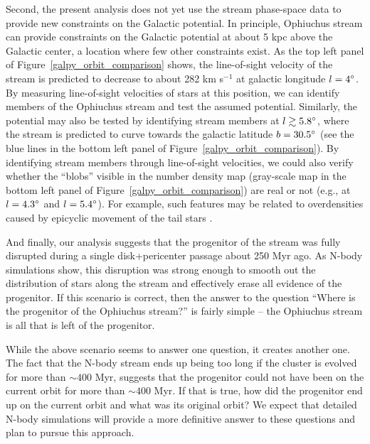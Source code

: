 \documentclass[iop]{emulateapj}
\begin{document}
Second, the present analysis does not yet use the stream phase-space data to
provide new constraints on the Galactic potential. In principle, Ophiuchus
stream can provide constraints on the Galactic potential at about 5 kpc above
the Galactic center, a location where few other constraints exist. As the top
left panel of Figure~\ref{galpy_orbit_comparison} shows, the line-of-sight
velocity of the stream is predicted to decrease to about 282 km s$^{-1}$ at
galactic longitude $l=4\mbox{$^\circ$}$. By measuring line-of-sight velocities of stars
at this position, we can identify members of the Ophiuchus stream and test the
assumed potential. Similarly, the potential may also be tested by identifying
stream members at $l\gtrsim5.8\mbox{$^\circ$}$, where the stream is predicted to curve
towards the galactic latitude $b=30.5\mbox{$^\circ$}$ (see the blue lines in the bottom
left panel of Figure~\ref{galpy_orbit_comparison}). By identifying stream
members through line-of-sight velocities, we could also verify whether the
``blobs'' visible in the number density map (gray-scale map in the bottom left
panel of Figure~\ref{galpy_orbit_comparison}) are real or not (e.g., at
$l=4.3\mbox{$^\circ$}$ and $l=5.4\mbox{$^\circ$}$). For example, such features may be related to
overdensities caused by epicyclic movement of the tail stars \citep{klh12}.

And finally, our analysis suggests that the progenitor of the stream was fully
disrupted during a single disk+pericenter passage about 250 Myr ago. As N-body
simulations show, this disruption was strong enough to smooth out the
distribution of stars along the stream and effectively erase all evidence of the
progenitor. If this scenario is correct, then the answer to the question ``Where
is the progenitor of the Ophiuchus stream?'' is fairly simple -- the Ophiuchus
stream is all that is left of the progenitor.

While the above scenario seems to answer one question, it creates another one.
The fact that the N-body stream ends up being too long if the cluster is evolved
for more than $\sim400$ Myr, suggests that the progenitor could not have been on
the current orbit for more than $\sim400$ Myr. If that is true, how did the
progenitor end up on the current orbit and what was its original orbit? We
expect that detailed N-body simulations will provide a more definitive answer to
these questions and plan to pursue this approach.

\acknowledgments
\end{document}
